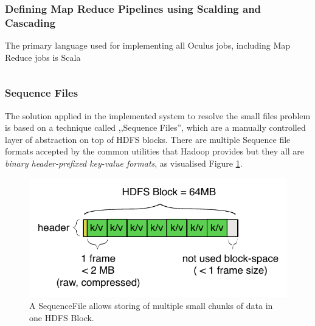 \subsubsection{Defining Map Reduce Pipelines using Scalding and Cascading}
The primary language used for implementing all Oculus jobs, including Map Reduce jobs is Scala \cite{scala}

\begin{lstlisting}[caption={Simplest Scalding job used in Oculus -- each frame perceptual hashing}, label={lst:simplest-scalding-job}]

\end{lstlisting}



\subsubsection{Sequence Files}
\label{sequence-file}
The solution applied in the implemented system to resolve the small files problem is based on a technique called ,,Sequence Files'', which are a manually controlled layer of abstraction on top of HDFS blocks. There are multiple Sequence file formats accepted by the common utilities that Hadoop provides \cite{hadoop-seq-files} but they all are \textit{binary header-prefixed key-value formats}, as visualised Figure \ref{fig:sequence-file}.


\begin{figure}[ch!]
  \centering
  \includegraphics[scale=0.9]{diagrams/sequence-file.pdf}
  \caption{A SequenceFile allows storing of multiple small chunks of data in one HDFS Block.}
  \label{fig:sequence-file}
\end{figure}

